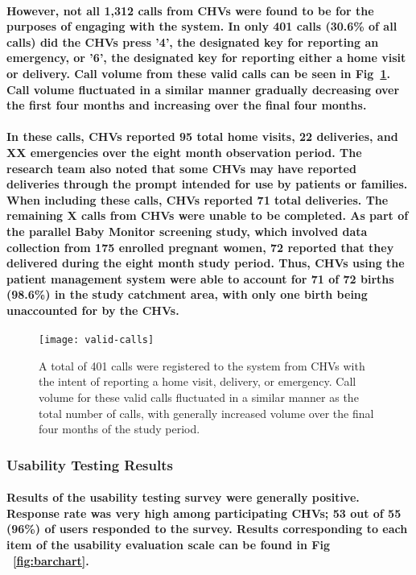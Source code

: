 \paragraph{However, not all 1,312 calls from CHVs were found to be for the purposes of engaging with the system. In only 401 calls (30.6\% of all calls)  did the CHVs press '4', the designated key for reporting an emergency, or '6', the designated key for reporting either a home visit or delivery. Call volume from these valid calls can be seen in Fig~\ref{fig:validCHVcalls}. Call volume fluctuated in a similar manner gradually decreasing over the first four months and increasing over the final four months.}

\paragraph{In these calls, CHVs reported 95 total home visits, 22 deliveries, and XX emergencies over the eight month observation period. The research team also noted that some CHVs may have reported deliveries through the prompt intended for use by patients or families. When including these calls, CHVs reported 71 total deliveries. The remaining X calls from CHVs were unable to be completed. As part of the parallel Baby Monitor screening study, which involved data collection from 175 enrolled pregnant women, 72 reported that they delivered during the eight month study period. Thus, CHVs using the patient management system were able to account for 71 of 72 births (98.6\%) in the study catchment area, with only one birth being unaccounted for by the CHVs.}

\begin{figure}[h]
	\begin{center}
	\texttt{[image: valid-calls]}
	\end{center}
	\caption[Valid CHV Calls]{A total of 401 calls were registered to the system from CHVs with the intent of reporting a home visit, delivery, or emergency. Call volume for these valid calls fluctuated in a similar manner as the total number of calls, with generally increased volume over the final four months of the study period.}
	\label{fig:validCHVcalls}
\end{figure}

\subsubsection{Usability Testing Results}
\paragraph{Results of the usability testing survey were generally positive. Response rate was very high among participating CHVs; 53 out of 55 (96\%) of users responded to the survey. Results corresponding to each item of the usability evaluation scale can be found in Fig ~\ref{fig:barchart}.} 


